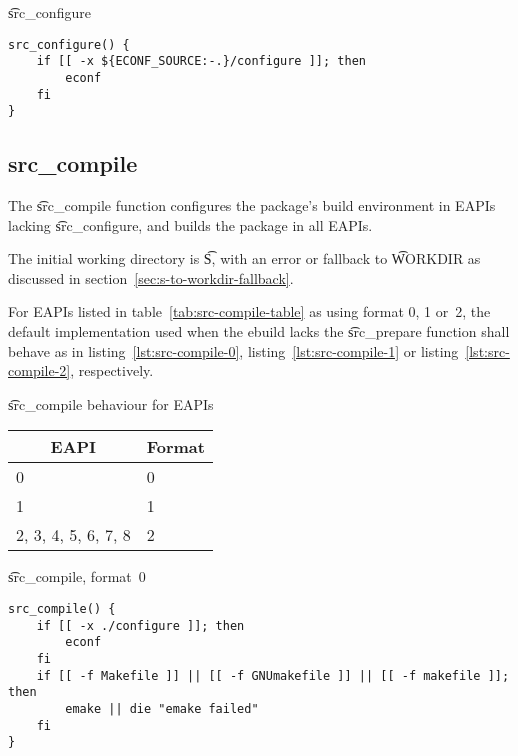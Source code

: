 \begin{listing}[H]
\caption{\t{src_configure}} \label{lst:src-configure-2}
\begin{verbatim}
src_configure() {
    if [[ -x ${ECONF_SOURCE:-.}/configure ]]; then
        econf
    fi
}
\end{verbatim}
\end{listing}

\subsection{src_compile}

 The \t{src_compile} function configures the package's build environment
in EAPIs lacking \t{src_configure}, and builds the package in all EAPIs.

The initial working directory is \t{S}, with an error or fallback to \t{WORKDIR} as discussed in
section~\ref{sec:s-to-workdir-fallback}.

For EAPIs listed in table~\ref{tab:src-compile-table} as using format 0, 1 or~2, the default
implementation used when the ebuild lacks the \t{src_prepare} function shall behave as in
listing~\ref{lst:src-compile-0}, listing~\ref{lst:src-compile-1} or listing~\ref{lst:src-compile-2},
respectively.

\begin{centertable}{\t{src_compile} behaviour for EAPIs}
    \label{tab:src-compile-table}
    \begin{tabular}{ll}
      \toprule
      \multicolumn{1}{c}{\textbf{EAPI}} &
      \multicolumn{1}{c}{\textbf{Format}} \\
      \midrule
      0                   & 0 \\
      1                   & 1 \\
      2, 3, 4, 5, 6, 7, 8 & 2 \\
      \bottomrule
    \end{tabular}
\end{centertable}

\begin{listing}[H]
\caption{\t{src_compile}, format~0} \label{lst:src-compile-0}
\begin{verbatim}
src_compile() {
    if [[ -x ./configure ]]; then
        econf
    fi
    if [[ -f Makefile ]] || [[ -f GNUmakefile ]] || [[ -f makefile ]]; then
        emake || die "emake failed"
    fi
}
\end{verbatim}
\end{listing}


